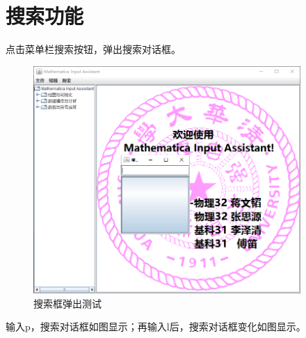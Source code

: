 \documentclass[hyperref, UTF8
,bookmarksnumbered=true, oneside]{ctexbook}
\begin{document}
    \section{搜索功能}
    点击菜单栏搜索按钮，弹出搜索对话框。

    \begin{figure}[!h]
                	\centering
                	\includegraphics[width=4in]{17.png}
                	\caption{搜索框弹出测试}    
                	\label{pic:MathObject}
            	\end{figure}

            	输入p，搜索对话框如图显示；再输入l后，搜索对话框变化如图显示。
\end{document}
